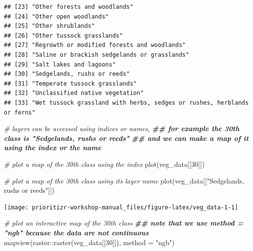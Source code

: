 \documentclass[
  12pt,
]{book}
\newenvironment{Shaded}{\begin{snugshade}}{\end{snugshade}}
\newcommand{\AttributeTok}[1]{\textcolor[rgb]{0.77,0.63,0.00}{#1}}
\newcommand{\CommentTok}[1]{\textcolor[rgb]{0.56,0.35,0.01}{\textit{#1}}}
\newcommand{\DecValTok}[1]{\textcolor[rgb]{0.00,0.00,0.81}{#1}}
\newcommand{\DocumentationTok}[1]{\textcolor[rgb]{0.56,0.35,0.01}{\textbf{\textit{#1}}}}
\newcommand{\FunctionTok}[1]{\textcolor[rgb]{0.00,0.00,0.00}{#1}}
\newcommand{\NormalTok}[1]{#1}
\newcommand{\SpecialCharTok}[1]{\textcolor[rgb]{0.00,0.00,0.00}{#1}}
\newcommand{\StringTok}[1]{\textcolor[rgb]{0.31,0.60,0.02}{#1}}
\begin{document}
\begin{verbatim}
## [23] "Other forests and woodlands"                                                                               
## [24] "Other open woodlands"                                                                                      
## [25] "Other shrublands"                                                                                          
## [26] "Other tussock grasslands"                                                                                  
## [27] "Regrowth or modified forests and woodlands"                                                                
## [28] "Saline or brackish sedgelands or grasslands"                                                               
## [29] "Salt lakes and lagoons"                                                                                    
## [30] "Sedgelands, rushs or reeds"                                                                                
## [31] "Temperate tussock grasslands"                                                                              
## [32] "Unclassified native vegetation"                                                                            
## [33] "Wet tussock grassland with herbs, sedges or rushes, herblands or ferns"
\end{verbatim}

\begin{Shaded}
\begin{Highlighting}[]
\CommentTok{\# layers can be accessed using indices or names,}
\DocumentationTok{\#\# for example the 30th class is "Sedgelands, rushs or reeds"}
\DocumentationTok{\#\# and we can make a map of it using the index or the name}

\CommentTok{\# plot a map of the 30th class using the index}
\FunctionTok{plot}\NormalTok{(veg\_data[[}\DecValTok{30}\NormalTok{]])}

\CommentTok{\# plot a map of the 30th class using its layer name}
\FunctionTok{plot}\NormalTok{(veg\_data[[}\StringTok{"Sedgelands, rushs or reeds"}\NormalTok{]])}
\end{Highlighting}
\end{Shaded}

\begin{center}\texttt{[image: prioritizr-workshop-manual\_files/figure-latex/veg\_data-1-1]} \end{center}

\begin{Shaded}
\begin{Highlighting}[]
\CommentTok{\# plot an interactive map of the 30th class}
\DocumentationTok{\#\# note that we use method = "ngb" because the data are not continuous}
\FunctionTok{mapview}\NormalTok{(raster}\SpecialCharTok{::}\FunctionTok{raster}\NormalTok{(veg\_data[[}\DecValTok{30}\NormalTok{]]), }\AttributeTok{method =} \StringTok{"ngb"}\NormalTok{)}
\end{Highlighting}
\end{Shaded}
\end{document}
